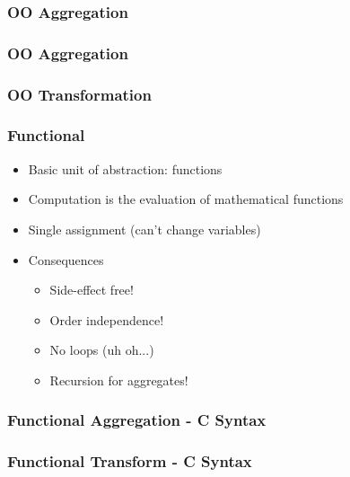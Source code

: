 \begin{frame}[fragile]
  \frametitle{OO Aggregation}
  \pause
  
\end{frame}

\begin{frame}[fragile]
  \frametitle{OO Aggregation}
  
\end{frame}

\begin{frame}[fragile]
  \frametitle{OO Transformation}
  \pause
  
\end{frame}

\begin{frame}
  \frametitle{Functional}
  \pause
  \begin{itemize}[<+->]
    \item Basic unit of abstraction: functions
    \item Computation is the evaluation of mathematical functions
    \item Single assignment (can't change variables)
    \item Consequences
          \begin{itemize}[<+->]
            \item Side-effect free!
            \item Order independence!
            \item No loops (uh oh...)
            \item Recursion for aggregates!
          \end{itemize}
  \end{itemize}
\end{frame}

\begin{frame}[fragile]
  \frametitle{Functional Aggregation - C Syntax}
  \pause
  
\end{frame}

\begin{frame}[fragile]
  \frametitle{Functional Transform - C Syntax}
  \pause
  
\end{frame}

